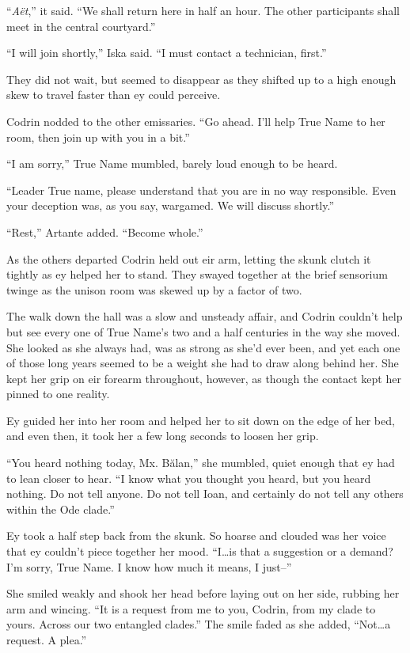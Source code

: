 ``\emph{Aët},'' it said. ``We shall return here in half an hour. The other participants shall meet in the central courtyard.''

``I will join shortly,'' Iska said. ``I must contact a technician, first.''

They did not wait, but seemed to disappear as they shifted up to a high enough skew to travel faster than ey could perceive.

Codrin nodded to the other emissaries. ``Go ahead. I'll help True Name to her room, then join up with you in a bit.''

``I am sorry,'' True Name mumbled, barely loud enough to be heard.

``Leader True name, please understand that you are in no way responsible. Even your deception was, as you say, wargamed. We will discuss shortly.''

``Rest,'' Artante added. ``Become whole.''

As the others departed Codrin held out eir arm, letting the skunk clutch it tightly as ey helped her to stand. They swayed together at the brief sensorium twinge as the unison room was skewed up by a factor of two.

The walk down the hall was a slow and unsteady affair, and Codrin couldn't help but see every one of True Name's two and a half centuries in the way she moved. She looked as she always had, was as strong as she'd ever been, and yet each one of those long years seemed to be a weight she had to draw along behind her. She kept her grip on eir forearm throughout, however, as though the contact kept her pinned to one reality.

Ey guided her into her room and helped her to sit down on the edge of her bed, and even then, it took her a few long seconds to loosen her grip.

``You heard nothing today, Mx. Bălan,'' she mumbled, quiet enough that ey had to lean closer to hear. ``I know what you thought you heard, but you heard nothing. Do not tell anyone. Do not tell Ioan, and certainly do not tell any others within the Ode clade.''

Ey took a half step back from the skunk. So hoarse and clouded was her voice that ey couldn't piece together her mood. ``I\ldots is that a suggestion or a demand? I'm sorry, True Name. I know how much it means, I just--''

She smiled weakly and shook her head before laying out on her side, rubbing her arm and wincing. ``It is a request from me to you, Codrin, from my clade to yours. Across our two entangled clades.'' The smile faded as she added, ``Not\ldots a request. A plea.''

